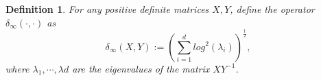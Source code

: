 \documentclass[letterpaper, 10 pt, conference]{ieeeconf}  %
\newcommand{\transpose}{\mathsf{T}}
\newtheorem{lemma}{Lemma}
\newtheorem{definition}{Definition}
\begin{document}
\begin{definition}
    For any positive definite matrices $X,Y$, define the operator $\delta_{\infty}(\cdot, \cdot)$ as
    \begin{equation*}
        \delta_{\infty}(X, Y) := (\sum_{i=1}^{d} log^{2}(\lambda_{i}))^{\frac{1}{2}},
    \end{equation*}
    where $\lambda_{1},\cdots, \lambda{d}$ are the eigenvalues of the matrix $XY^{-1}$.
\end{definition}
\end{document}
